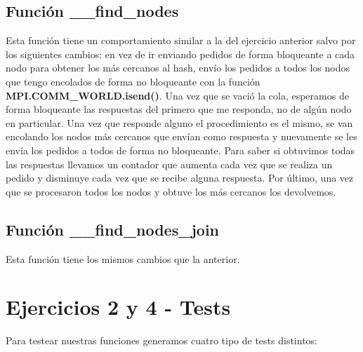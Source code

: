 \subsection{Función \_\_find\_nodes}
Esta función tiene un comportamiento similar a la del ejercicio anterior salvo por los siguientes cambios: en vez de ir enviando pedidos de forma bloqueante a cada nodo para obtener los más cercanos al hash, envío los pedidos a todos los nodos que tengo encolados de forma no bloqueante con la función \textbf{MPI.COMM\_WORLD.isend()}. Una vez que se vació la cola, esperamos de forma bloqueante las respuestas del primero que me responda, no de algún nodo en particular. Una vez que responde alguno el procedimiento es el mismo, se van encolando los nodos más cercanos que envían como respuesta y nuevamente se les envía los pedidos a todos de forma no bloqueante. Para saber si obtuvimos todas las respuestas llevamos un contador que aumenta cada vez que se realiza un pedido y disminuye cada vez que se recibe alguna respuesta. Por último, una vez que se procesaron todos los nodos y obtuve los más cercanos los devolvemos.

\subsection{Función \_\_find\_nodes\_join}
Esta función tiene los mismos cambios que la anterior.


\section{Ejercicios 2 y 4 - Tests}

Para testear nuestras funciones generamos cuatro tipo de tests distintos:

